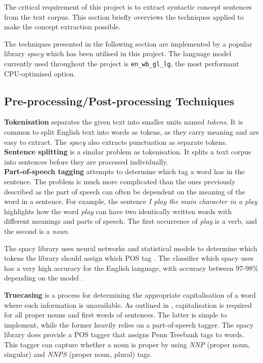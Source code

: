 The critical requirement of this project is to extract syntactic concept sentences from the text corpus.
This section briefly overviews the techniques applied to make the concept extraction possible.

The techniques presented in the following section are implemented by a popular library \emph{spacy} \cite{RefWorks:RefID:24-spacy} which has been utilised in this project. 
The language model currently used throughout the project is \verb+en_wb_gl_lg+, the most performant CPU-optimised option.

\subsection{Pre-processing/Post-processing Techniques}
\label{nlp-processing-techniques}

\textbf{Tokenisation} \cite{RefWorks:RefID:28-jurafsky2014speech} separates the given text into smaller units named \emph{tokens}. 
It is common to split English text into words as tokens, as they carry meaning and are easy to extract.
The \emph{spacy} also extracts punctuation as separate tokens. \\

\textbf{Sentence splitting} is a similar problem as tokenisation. It splits a text corpus into sentences before they are processed individually. \\

\textbf{Part-of-speech tagging} \cite{RefWorks:RefID:28-jurafsky2014speech} attempts to determine which tag a word has in the sentence.
The problem is much more complicated than the ones previously described as the part of speech can often be dependent on the meaning of the word in a sentence.
For example, the sentence \emph{I play the main character in a play} highlights how the word \emph{play} can have two identically written words with different meanings and parts of speech.
The first occurrence of \emph{play} is a verb, and the second is a \emph{noun}.

The spacy library uses neural networks and statistical models to determine which tokens the library should assign which POS tag \cite{RefWorks:RefID:25-spacy}.
The classifier which spacy uses has a very high accuracy for the English language, with accuracy between 97-98\% depending on the model \cite{RefWorks:RefID:26-spacy}.

\textbf{Truecasing} \cite{RefWorks:RefID:81-lita2003truecasing} is a process for determining the appropriate capitalisation of a word where such information is unavailable. 
As outlined in \cite{RefWorks:RefID:91-luo2020capitalization}, capitalisation is required for all proper nouns and first words of sentences. 
The latter is simple to implement, while the former heavily relies on a part-of-speech tagger. 
The spacy library does provide a POS tagger that assigns Penn Treebank \cite{RefWorks:RefID:29-mrini2019rethinking} tags to words.
This tagger can capture whether a noun is proper by using \textit{NNP} (proper noun, singular) and \textit{NNPS} (proper noun, plural) tags.


